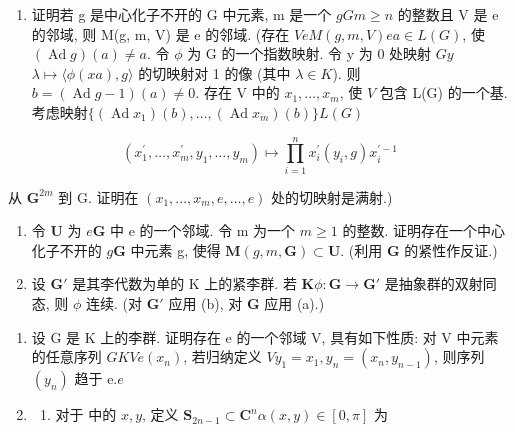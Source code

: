 \begin{enumerate}
\def\labelenumi{(\alph{enumi})}
\tightlist
\item
  证明若 g 是中心化子不开的 G 中元素, m 是一个 \(g\)\(G\)\(m\)\(\geqslant n\) 的整数且 V 是 e 的邻域, 则 M(g, m, V) 是 e 的邻域. (存在 \(V\)\(e\)\(M(g, m, V)\)\(e\)\(a \in L(G)\), 使 \((\operatorname{Ad} g)(a) \neq a\). 令 \(\phi\) 为 G 的一个指数映射. 令 y 为 0 处映射 \(G\)\(y\)\(\lambda \mapsto \langle \phi(xa), g \rangle\) 的切映射对 1 的像 (其中 \(\lambda \in K\)). 则 \(b = (\operatorname{Ad} g - 1)(a) \neq 0\). 存在 V 中的 \(x_1, \ldots, x_m\), 使 \(V\) 包含 L(G) 的一个基. 考虑映射\(\{(\operatorname{Ad} x_1)(b), \ldots, (\operatorname{Ad} x_m)(b)\}\)\(L(G)\)
\end{enumerate}

\[
\left(x _ {1} ^ {\prime}, \dots , x _ {m} ^ {\prime}, y _ {1}, \dots , y _ {m}\right) \mapsto \prod_ {i = 1} ^ {n} x _ {i} ^ {\prime} (y _ {i}, g) x _ {i} ^ {\prime - 1}
\]

从 \(\mathbf{G}^{2m}\) 到 G. 证明在 \((x_{1},\ldots ,x_{m},e,\ldots ,e)\) 处的切映射是满射.)

\begin{enumerate}
\def\labelenumi{(\alph{enumi})}
\setcounter{enumi}{1}
\item
  令 \(\mathbf{U}\) 为 \(e\)\(\mathbf{G}\) 中 e 的一个邻域. 令 m 为一个 \(m\)\(\geqslant 1\) 的整数. 证明存在一个中心化子不开的 \(g\)\(\mathbf{G}\) 中元素 g, 使得 \(\mathbf{M}(g, m, \mathbf{G}) \subset \mathbf{U}\). (利用 \(\mathbf{G}\) 的紧性作反证.)
\item
  设 \(\mathbf{G}'\) 是其李代数为单的 K 上的紧李群. 若 \(\mathbf{K}\)\(\phi: \mathbf{G} \to \mathbf{G}'\) 是抽象群的双射同态, 则 \(\phi\) 连续. (对 \(\mathbf{G}'\) 应用 (b), 对 \(\mathbf{G}\) 应用 (a).)
\end{enumerate}

\begin{enumerate}
\def\labelenumi{\arabic{enumi}.}
\setcounter{enumi}{9}
\item
  设 G 是 K 上的李群. 证明存在 e 的一个邻域 V, 具有如下性质: 对 V 中元素的任意序列 \(G\)\(K\)\(V\)\(e\)\((x_{n})\), 若归纳定义 \(V\)\(y_{1} = x_{1}, y_{n} = (x_{n}, y_{n-1})\), 则序列 \((y_{n})\) 趋于 e.\(e\)
\item
  \begin{enumerate}
  \def\labelenumii{(\alph{enumii})}
  \tightlist
  \item
    对于  中的 \(x, y\), 定义 \(\mathbf{S}_{2n-1} \subset \mathbf{C}^n\)\(\alpha(x, y) \in [0, \pi]\) 为
  \end{enumerate}
\end{enumerate}

